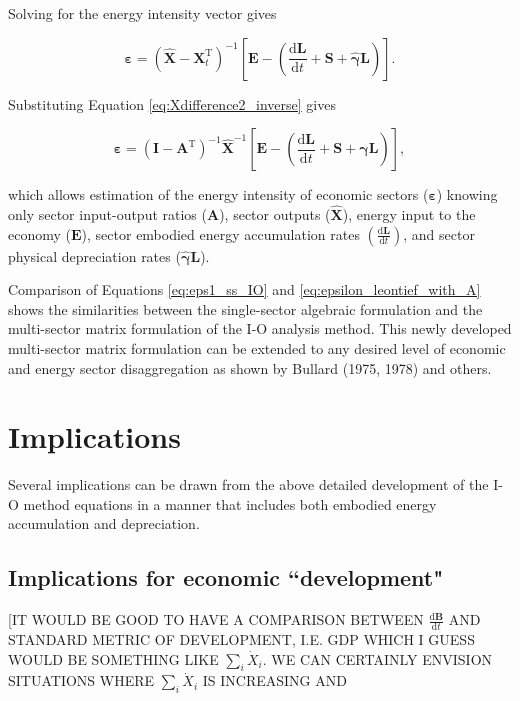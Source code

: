 \documentclass[authoryear,preprint,review,12pt]{elsarticle}
\let\oldhat\hat
\renewcommand{\vec}[1]{\mathbf{#1}}
\renewcommand{\hat}[1]{\oldhat{\mathbf{#1}}}
\begin{document}
Solving for the energy intensity vector gives

\begin{equation} \label{eq:D-epsilon_leontief}
	\vec{\varepsilon} = (\hat{\vec{X}} - \vec{X}_{t}^{\mathrm{T}})^{-1}\left[\vec{E} - \left(\frac{\mathrm{d}\vec{L}}{\mathrm{d}t} + \vec{S} + \hat{\vec{\gamma}}\vec{L}\right)\right].
\end{equation}

\noindent Substituting Equation \ref{eq:Xdifference2_inverse} gives

\begin{equation} \label{eq:D-epsilon_leontief_with_A}
	\vec{\varepsilon} = (\vec{I} - \vec{A}^{\mathrm{T}})^{-1}\hat{\vec{X}}^{-1}\left[\vec{E} - \left(\frac{\mathrm{d}\vec{L}}{\mathrm{d}t} + \vec{S} + \hat{\vec{\gamma}}\vec{L}\right)\right],
\end{equation}

\noindent which allows estimation of the energy intensity of economic sectors ($\vec{\varepsilon}$) knowing only sector input-output ratios ($\vec{A}$), sector outputs ($\hat{\vec{X}}$), energy input to the economy ($\vec{E}$), sector embodied energy accumulation rates $\left(\frac{\mathrm{d}\vec{L}}{\mathrm{d}t}\right)$, and sector physical depreciation rates ($\hat{\vec{\gamma}}\vec{L}$).

Comparison of Equations \ref{eq:eps1_ss_IO} and \ref{eq:epsilon_leontief_with_A} shows the similarities between the single-sector algebraic formulation and the multi-sector matrix formulation of the I-O analysis method. This newly developed multi-sector matrix formulation can be extended to any desired level of economic and energy sector disaggregation as shown by Bullard (1975, 1978) and others.


\section{Implications}

Several implications can be drawn from the above detailed development of the I-O method equations in a manner that includes both embodied energy accumulation and depreciation.

\subsection{Implications for economic ``development"}

[IT WOULD BE GOOD TO HAVE A COMPARISON BETWEEN $\frac{\mathrm{d}\vec{B}}{\mathrm{d}t}$ AND STANDARD METRIC OF DEVELOPMENT, I.E. GDP WHICH I GUESS WOULD BE SOMETHING LIKE $\sum_{i}\dot{X}_{i}$. WE CAN CERTAINLY ENVISION SITUATIONS WHERE $\sum_{i}\dot{X}_{i}$ IS INCREASING AND 
\end{document}
